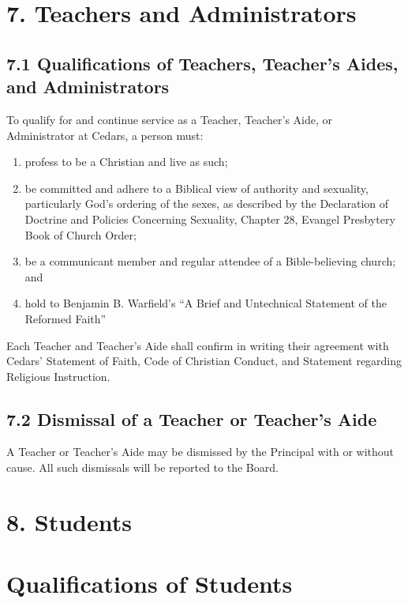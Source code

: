\documentclass[
]{book}
\providecommand{\tightlist}{%
  \setlength{\itemsep}{0pt}\setlength{\parskip}{0pt}}
\begin{document}
\section{7. Teachers and Administrators}\label{teachers-and-administrators}

\subsection{7.1 Qualifications of Teachers, Teacher's Aides, and Administrators}\label{qualifications-of-teachers-teachers-aides-and-administrators}

To qualify for and continue service as a Teacher, Teacher's Aide, or Administrator at Cedars, a person must:

\begin{enumerate}
\def\labelenumi{\alph{enumi}.}
\tightlist
\item
  profess to be a Christian and live as such;
\item
  be committed and adhere to a Biblical view of authority and sexuality, particularly God's ordering of the sexes, as described by the Declaration of Doctrine and Policies Concerning Sexuality, Chapter 28, Evangel Presbytery Book of Church Order;
\item
  be a communicant member and regular attendee of a Bible-believing church; and
\item
  hold to Benjamin B. Warfield's ``A Brief and Untechnical Statement of the Reformed Faith''
\end{enumerate}

Each Teacher and Teacher's Aide shall confirm in writing their agreement with Cedars' Statement of Faith, Code of Christian Conduct, and Statement regarding Religious Instruction.

\subsection{7.2 Dismissal of a Teacher or Teacher's Aide}\label{dismissal-of-a-teacher-or-teachers-aide}

A Teacher or Teacher's Aide may be dismissed by the Principal with or without cause. All such dismissals will be reported to the Board.

\section{8. Students}\label{students}

\section{Qualifications of Students}\label{qualifications-of-students}
\end{document}
